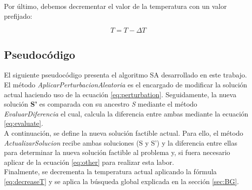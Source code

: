 Por último, debemos decrementar el valor de la temperatura con un valor prefijado: 

\begin{equation} \label{eq:decreaseT}
    T = T - \Delta T
\end{equation}

\subsection{Pseudocódigo}
El siguiente pseudocódigo presenta el algoritmo SA desarrollado en este trabajo. \\
El método \textit{AplicarPerturbacionAleatoria} es el encargado de modificar la solución actual haciendo uso de la ecuación \ref{eq:perturbation}. Seguidamente, la nueva solución \textbf{S'} es comparada con su ancestro \textit{S} mediante el método \textit{EvaluarDiferencia} el cual, calcula la diferencia entre ambas mediante la ecuación \ref{eq:evaluate}. \\
A continuación, se define la nueva solución factible actual. Para ello, el método \textit{ActualizarSolucion} recibe ambas soluciones (S y S') y la diferencia entre ellas para determinar la nueva solución factible al problema y, si fuera necesario aplicar de la ecuación \ref{eq:other} para realizar esta labor. \\
Finalmente, se decrementa la temperatura actual aplicando la fórmula \ref{eq:decreaseT} y se aplica la búsqueda global explicada en la sección \ref{sec:BG}.


